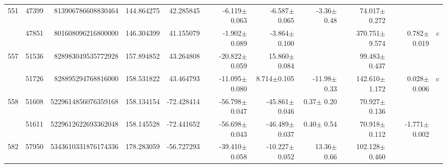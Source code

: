 \documentclass{ws-ijmpd}
\begin{document}
\begin{landscape}
\begin{longtable}{rrrrrrrrrrl}
 \hline 551 &   47399 &       813906786608830464 &                   144.864275 &                    42.285845 &                 -6.119$\pm$0.063 &                 -6.587$\pm$0.065 &          -3.36$\pm$  0.48 &        74.017$\pm$0.272 &                                           &                                                    \\
            &   47851 &       801608096216800000 &                   146.304399 &                    41.155079 &                 -1.902$\pm$0.089 &                 -3.864$\pm$0.100 &                           &       370.751$\pm$9.574 &                           0.782$\pm$0.019 &                                                  c \\
 \hline 557 &   51536 &       828983049535772928 &                   157.894852 &                    43.264808 &                -20.822$\pm$0.059 &                 15.860$\pm$0.084 &                           &        99.483$\pm$0.437 &                                           &                                                    \\
            &   51726 &       828895294768816000 &                   158.531822 &                    43.464793 &                -11.095$\pm$0.080 &                  8.714$\pm$0.105 &         -11.98$\pm$  0.33 &       142.610$\pm$1.172 &                           0.028$\pm$0.006 &                                                  c \\
 \hline 558 &   51608 &      5229614856076359168 &                   158.134154 &                   -72.428414 &                -56.798$\pm$0.047 &                -45.861$\pm$0.046 &           0.37$\pm$  0.20 &        70.927$\pm$0.136 &                                           &                                                    \\
            &   51611 &      5229612622693362048 &                   158.145528 &                   -72.441652 &                -56.698$\pm$0.043 &                -46.489$\pm$0.037 &           0.40$\pm$  0.54 &        70.918$\pm$0.112 &                          -1.771$\pm$0.002 &                                                    \\
 \hline 582 &   57950 &      5343610331876174336 &                   178.283059 &                   -56.727293 &                -39.410$\pm$0.058 &                -10.227$\pm$0.052 &          13.36$\pm$  0.66 &       102.128$\pm$0.460 &                                           &                                                    \\

\end{longtable}
\end{landscape}
\end{document}
